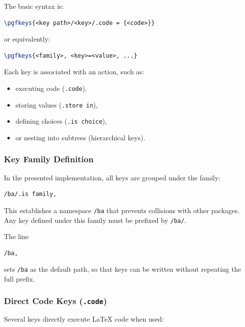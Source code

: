 The basic syntax is:

\begin{lstlisting}[language=LaTeX]
\pgfkeys{<key path>/<key>/.code = {<code>}}
\end{lstlisting}

or equivalently:

\begin{lstlisting}[language=LaTeX]
\pgfkeys{<family>, <key>=<value>, ...}
\end{lstlisting}

Each key is associated with an action, such as:

\begin{itemize}
\item executing code (\texttt{.code}),
\item storing values (\texttt{.store in}),
\item defining choices (\texttt{.is choice}),
\item or nesting into subtrees (hierarchical keys).
\end{itemize}



\subsubsection{Key Family Definition}

In the presented implementation, all keys are grouped under the family:

\begin{lstlisting}[language=LaTeX]
/ba/.is family,
\end{lstlisting}

This establishes a namespace \texttt{/ba} that prevents collisions with other packages. Any key defined under this family must be prefixed by \texttt{/ba/}.

The line

\begin{lstlisting}[language=LaTeX]
/ba,
\end{lstlisting}

sets \texttt{/ba} as the default path, so that keys can be written without repeating the full prefix.



\subsubsection{Direct Code Keys (\texttt{.code})}

Several keys directly execute \LaTeX{} code when used:

